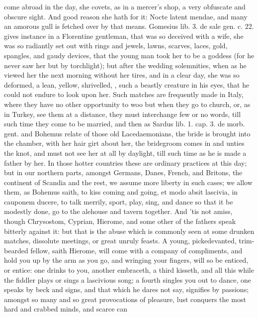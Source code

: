 {come abroad in the day, she covets, as in a mercer's shop, a very
obfuscate and obscure sight. And good reason she hath for it: Nocte
latent mendae, and many an amorous gull is fetched over by that means.
Gomesius lib. 3. de sale gen. c. 22. gives instance in a Florentine
gentleman, that was so deceived with a wife, she was so radiantly set
out with rings and jewels, lawns, scarves, laces, gold, spangles, and
gaudy devices, that the young man took her to be a goddess (for he
never saw her but by torchlight); but after the wedding solemnities,
when as he viewed her the next morning without her tires, and in a
clear day, she was so deformed, a lean, yellow, shrivelled, \etc{}, such a
beastly creature in his eyes, that he could not endure to look upon
her. Such matches are frequently made in Italy, where they have no
other opportunity to woo but when they go to church, or, as in
Turkey, see them at a distance, they must interchange few or no words,
till such time they come to be married, and then as Sardus lib. 1. cap.
3. de morb. gent. and Bohemus relate of those old Lacedaemonians,
the bride is brought into the chamber, with her hair girt about her,
the bridegroom comes in and unties the knot, and must not see her at
all by daylight, till such time as he is made a father by her. In those
hotter countries these are ordinary practices at this day; but in our
northern parts, amongst Germans, Danes, French, and Britons, the
continent of Scandia and the rest, we assume more liberty in such
cases; we allow them, as Bohemus saith, to kiss coming and going, et
modo absit lascivia, in cauponem ducere, to talk merrily, sport, play,
sing, and dance so that it be modestly done, go to the alehouse and
tavern together. And 'tis not amiss, though  Chrysostom, Cyprian,
Hierome, and some other of the fathers speak bitterly against it: but
that is the abuse which is commonly seen at some drunken matches,
dissolute meetings, or great unruly feasts. A young,
pickedevanted, trim-bearded fellow, saith Hierome, will come with a
company of compliments, and hold you up by the arm as you go, and
wringing your fingers, will so be enticed, or entice: one drinks to
you, another embraceth, a third kisseth, and all this while the fiddler
plays or sings a lascivious song; a fourth singles you out to dance,
one speaks by beck and signs, and that which he dares not say,
signifies by passions; amongst so many and so great provocations of
pleasure, lust conquers the most hard and crabbed minds, and scarce can
}
